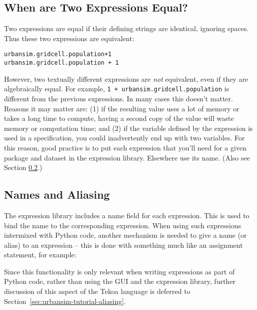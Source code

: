 \subsection{When are Two Expressions Equal?}
\label{sec:expression-equality}

Two expressions are equal if their defining strings are identical, ignoring
spaces.  Thus these two expressions are equivalent:

\begin{verbatim}
urbansim.gridcell.population+1
urbansim.gridcell.population + 1
\end{verbatim}

However, two textually different expressions are \emph{not} equivalent,
even if they are algebraically equal.  For example,
\verb|1 + urbansim.gridcell.population| is different from the previous
expressions.  In many cases this doesn't matter.  Reasons it may matter
are: (1) if the resulting value uses a lot of memory or takes a long time
to compute, having a second copy of the value will waste memory or
computation time; and (2) if the variable defined by the expression is used
in a specification, you could inadvertently end up with two variables.  For
this reason, good practice is to put each expression that you'll need for a
given package and dataset in the expression library.  Elsewhere use its
name.  (Also see Section \ref{sec:expressions-aliasing}.)

\subsection{Names and Aliasing}
\label{sec:expressions-aliasing}

The expression library includes a name field for each expression.  This is
used to bind the name to the corresponding expression.  When using such
expressions intermixed with Python code, another mechanism is needed to
give a name (or alias) to an expression -- this is done with something much
like an assignment statement, for example:


Since this functionality is only relevant when writing expressions as part
of Python code, rather than using the GUI and the expression library,
further discussion of this aspect of the Tekoa language is deferred to
Section~\ref{sec:urbansim-tutorial-aliasing}.
